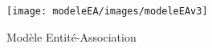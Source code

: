 \begin{figure}[H]
	\centering
	\texttt{[image: modeleEA/images/modeleEAv3]}
	\caption{Modèle Entité-Association}	
	\label{modeleEA}
\end{figure}	